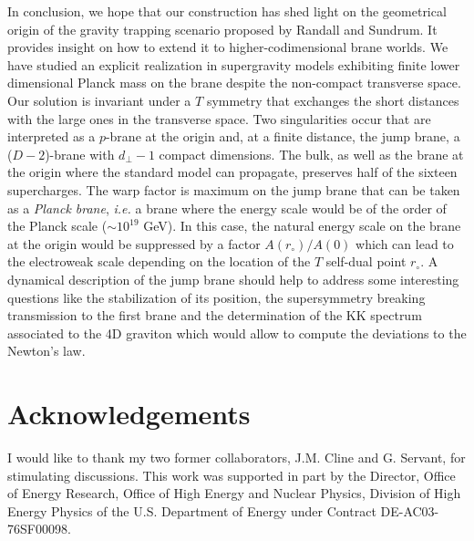 \documentclass[a4paper,12pt]{article}
\def\dperp{d_{\scriptscriptstyle\perp}}
\begin{document}
In conclusion, we hope that our construction has shed light on the geometrical
origin of the gravity trapping scenario proposed by Randall and Sundrum. It provides
insight on how to extend it to higher-codimensional brane worlds. We have studied
an explicit realization in supergravity models exhibiting finite lower dimensional
Planck mass on the brane despite the non-compact transverse space. Our solution
is invariant under a $T$ symmetry that exchanges the short distances with the
large ones in the transverse space. Two singularities occur that are interpreted as
a $p$-brane at the origin and, at a finite distance, the jump brane,
a ($D-2$)-brane with $\dperp-1$ compact dimensions. The bulk, as well as the
brane at the origin where the
standard model can propagate, preserves half of the sixteen supercharges.
The warp factor is maximum on the jump brane that can be taken as a
{\it Planck brane}, {\it i.e.} a brane where the energy scale would be of the order
of the Planck scale ($\sim 10^{19}$ GeV). In this case, the natural energy scale
on the brane at the origin would be suppressed by a factor $A(r_\circ)/A(0)$ which
can lead to the electroweak scale depending on the location of the $T$ self-dual
point $r_\circ$.
A dynamical description of the jump brane should help to address some interesting
questions like the stabilization of its position, the supersymmetry breaking
transmission to the first brane and the determination of the KK spectrum associated
to the 4D graviton which would allow to compute the deviations to the Newton's law.

\section*{Acknowledgements}

I would like to thank my two former collaborators, J.M. Cline
and G. Servant, for stimulating discussions.
This work was supported in part by the Director, Office
of Energy Research, Office of High Energy and Nuclear Physics, Division of
High Energy Physics of the U.S. Department of Energy under Contract
DE-AC03-76SF00098.
\end{document}
